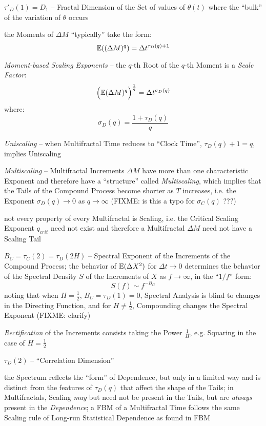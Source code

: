 $\tau'_D(1) = D_1$ -- Fractal Dimension of the Set of values of $\theta(t)$
where the ``bulk'' of the variation of $\theta$ occurs

the Moments of $\Delta M$ ``typically'' take the form:
\[
  \mathbb{E}((\Delta M)^q) = \Delta t^{\tau_D(q) + 1}
\]

\emph{Moment-based Scaling Exponents} -- the $q$-th Root of the $q$-th Moment is
a \emph{Scale Factor}:
\[
  \Big(\mathbb{E}(\Delta M)^q\Big)^\frac{1}{q} = \Delta t^{\sigma_D(q)}
\]
where:
\[
  \sigma_D(q) = \frac{1 + \tau_D(q)}{q}
\]

\emph{Uniscaling} -- when Multifractal Time reduces to ``Clock Time'',
$\tau_D(q) + 1 = q$, implies Uniscaling

\emph{Multiscaling} -- Multifractal Increments $\Delta M$ have more than one
characteristic Exponent and therefore have a ``structure'' called
\emph{Multiscaling}, which implies that the Tails of the Compound Process become
shorter as $T$ increases, i.e. the Exponent $\sigma_D(q) \to 0$ as
$q \to \infty$ (FIXME: is this a typo for $\sigma_C(q)$ ???)

not every property of every Multifractal is Scaling, i.e. the Critical Scaling
Exponent $q_{crit}$ need not exist and therefore a Multifractal $\Delta M$ need
not have a Scaling Tail

$B_C = \tau_C(2) = \tau_D(2H)$ -- Spectral Exponent of the Increments of the
Compound Process; the behavior of $\mathbb{E}(\Delta X^2)$ for $\Delta t \to 0$
determines the behavior of the Spectral Density $S$ of the Increments of $X$ as
$f \to \infty$, in the ``$1/f$'' form:
\[
  S(f) \sim f^{-B_C}
\]
noting that when $H = \frac{1}{2}$, $B_C = \tau_D(1) = 0$, Spectral Analysis is
blind to changes in the Directing Function, and for $H \neq \frac{1}{2}$,
Compounding changes the Spectral Exponent (FIXME: clarify)

\emph{Rectification} of the Increments consists taking the Power $\frac{1}{H}$,
e.g. Squaring in the case of $H = \frac{1}{2}$

$\tau_D(2)$ -- ``Correlation Dimension''

the Spectrum reflects the ``form'' of Dependence, but only in a limited way and
is distinct from the features of $\tau_D(q)$ that affect the shape of the Tails;
in Multifractals, Scaling \emph{may} but need not be present in the Tails, but
are \emph{always} present in the \emph{Dependence}; a FBM of a Multifractal Time
follows the same Scaling rule of Long-run Statistical Dependence as found in FBM

